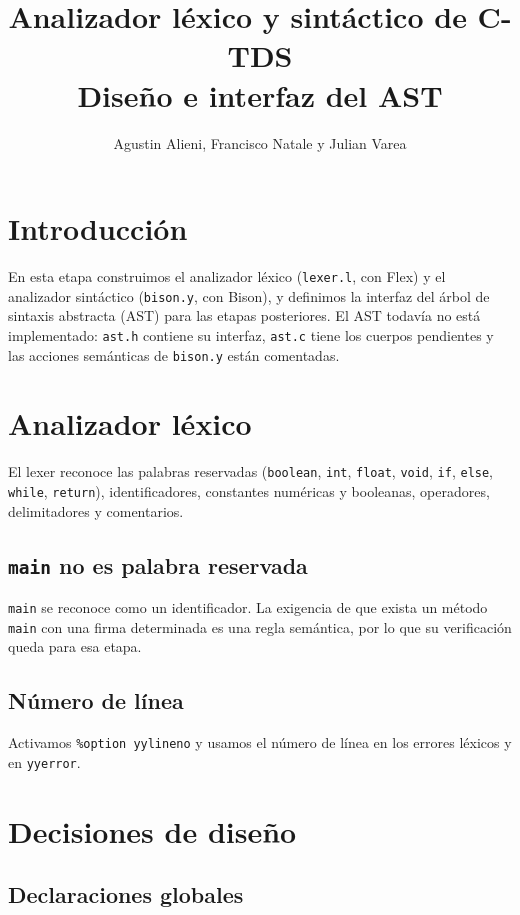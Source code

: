 \documentclass[11pt,a4paper]{article}
\title{Analizador léxico y sintáctico de C-TDS \\ \large Diseño e interfaz del AST}
\author{Agustin Alieni, Francisco Natale y Julian Varea}
\date{}
\begin{document}
\maketitle

\section{Introducción}

En esta etapa construimos el analizador léxico (\texttt{lexer.l}, con Flex) y
el analizador sintáctico (\texttt{bison.y}, con Bison), y definimos la
interfaz del árbol de sintaxis abstracta (AST) para las etapas posteriores.
El AST todavía no está implementado: \texttt{ast.h} contiene su interfaz,
\texttt{ast.c} tiene los cuerpos pendientes y las acciones semánticas de
\texttt{bison.y} están comentadas.

\section{Analizador léxico}

El lexer reconoce las palabras reservadas (\texttt{boolean}, \texttt{int},
\texttt{float}, \texttt{void}, \texttt{if}, \texttt{else}, \texttt{while},
\texttt{return}), identificadores, constantes numéricas y booleanas,
operadores, delimitadores y comentarios.

\subsection{\texttt{main} no es palabra reservada}

\texttt{main} se reconoce como un identificador. La exigencia de que exista
un método \texttt{main} con una firma determinada es una regla semántica, por
lo que su verificación queda para esa etapa.

\subsection{Número de línea}

Activamos \texttt{\%option yylineno} y usamos el número de línea en los
errores léxicos y en \texttt{yyerror}.

\section{Decisiones de diseño}
\label{sec:decisiones}

\subsection{Declaraciones globales}
\end{document}
